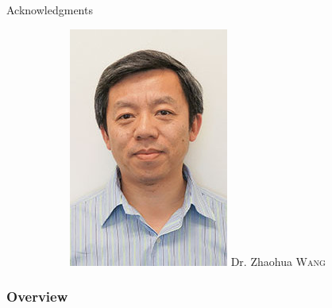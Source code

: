 \documentclass{beamer}
\begin{document}
\begin{frame}{Acknowledgments}
\begin{figure}
\begin{center}
\begin{subfigure}[t]{.3\linewidth}
          \includegraphics[height=1.2\linewidth]{figures/comettee/zhahoua_wang.jpg}
          Dr. Zhaohua \textsc{Wang}
        \end{subfigure}
      \end{center}
    \end{figure}
\end{frame}{}

\begin{frame}
\frametitle{Overview} %
\tableofcontents %
\end{frame}

\end{document}

